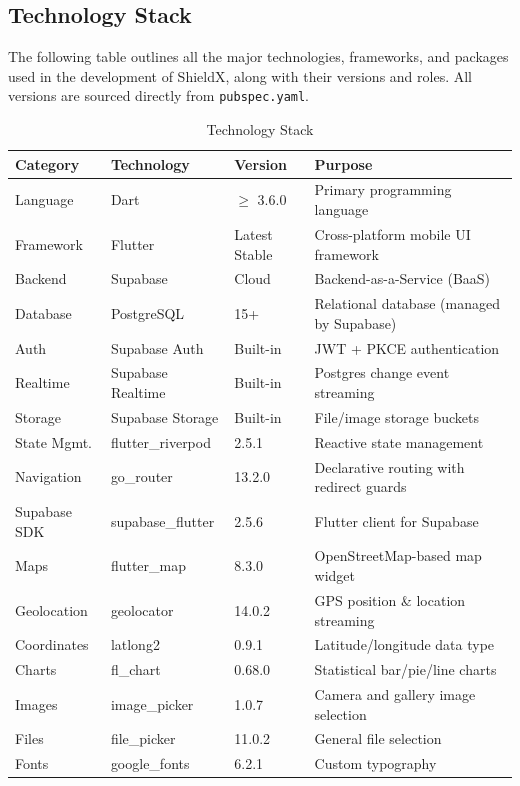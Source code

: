 \documentclass[12pt, a4paper, twoside]{report}
\begin{document}
\subsection{Technology Stack}
The following table outlines all the major technologies, frameworks, and packages used in the development of ShieldX, along with their versions and roles. All versions are sourced directly from \texttt{pubspec.yaml}.
\begin{table}[ht]
\centering
\caption{Technology Stack}
\label{tab:techstack}
\begin{tabularx}{\textwidth}{lllX}
\toprule
\textbf{Category} & \textbf{Technology} & \textbf{Version} & \textbf{Purpose} \\
\midrule
Language & Dart & $\geq$ 3.6.0 & Primary programming language \\
Framework & Flutter & Latest Stable & Cross-platform mobile UI framework \\
\addlinespace
Backend & Supabase & Cloud & Backend-as-a-Service (BaaS) \\
Database & PostgreSQL & 15+ & Relational database (managed by Supabase) \\
Auth & Supabase Auth & Built-in & JWT + PKCE authentication \\
Realtime & Supabase Realtime & Built-in & Postgres change event streaming \\
Storage & Supabase Storage & Built-in & File/image storage buckets \\
\addlinespace
State Mgmt. & flutter\_riverpod & 2.5.1 & Reactive state management \\
Navigation & go\_router & 13.2.0 & Declarative routing with redirect guards \\
Supabase SDK & supabase\_flutter & 2.5.6 & Flutter client for Supabase \\
\addlinespace
Maps & flutter\_map & 8.3.0 & OpenStreetMap-based map widget \\
Geolocation & geolocator & 14.0.2 & GPS position \& location streaming \\
Coordinates & latlong2 & 0.9.1 & Latitude/longitude data type \\
\addlinespace
Charts & fl\_chart & 0.68.0 & Statistical bar/pie/line charts \\
Images & image\_picker & 1.0.7 & Camera and gallery image selection \\
Files & file\_picker & 11.0.2 & General file selection \\
\addlinespace
Fonts & google\_fonts & 6.2.1 & Custom typography \\

\end{tabularx}
\end{table}
\end{document}
